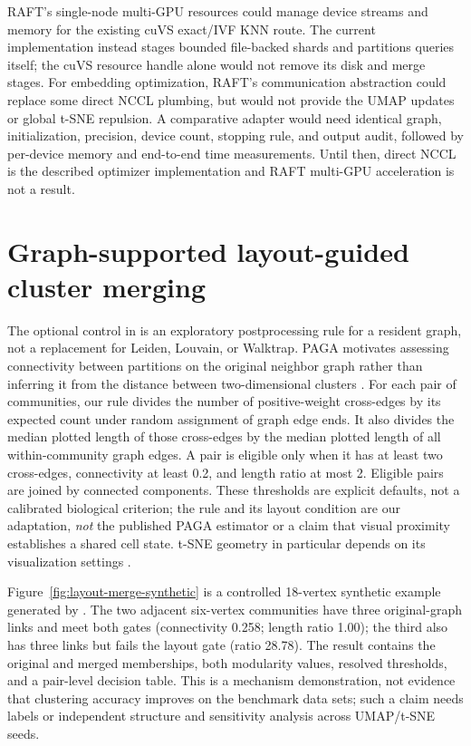 \documentclass[article]{jss}
\begin{document}
RAFT's single-node multi-GPU resources could manage device streams and
memory for the existing cuVS exact/IVF KNN route. The current implementation
instead stages bounded file-backed shards and partitions queries itself;
the cuVS resource handle alone would not remove its disk and merge stages.
For embedding optimization, RAFT's communication abstraction could replace
some direct NCCL plumbing, but would not provide the UMAP updates or global
t-SNE repulsion. A comparative adapter would need identical graph,
initialization, precision, device count, stopping rule, and output audit,
followed by per-device memory and end-to-end time measurements. Until then,
direct NCCL is the described optimizer implementation and RAFT multi-GPU
acceleration is not a result.

\section{Graph-supported layout-guided cluster merging}

The optional  control in  is an
exploratory postprocessing rule for a resident graph, not a replacement for
Leiden, Louvain, or Walktrap. PAGA motivates assessing connectivity between
partitions on the original neighbor graph rather than inferring it from the
distance between two-dimensional clusters \citep{wolf2019paga}. For each
pair of communities, our rule divides the number of positive-weight
cross-edges by its expected count under random assignment of graph edge
ends. It also divides the median plotted length of those cross-edges by
the median plotted length of all within-community graph edges. A pair is
eligible only when it has at least two cross-edges, connectivity at least
0.2, and length ratio at most 2. Eligible pairs are joined by connected
components. These thresholds are explicit defaults, not a calibrated
biological criterion; the rule and its layout condition are our adaptation,
\emph{not} the published PAGA estimator or a claim that visual proximity
establishes a shared cell state. t-SNE geometry in particular depends on
its visualization settings \citep{kobak2019}.

Figure~\ref{fig:layout-merge-synthetic} is a controlled 18-vertex synthetic
example generated by . The two
adjacent six-vertex communities have three original-graph links and meet
both gates (connectivity 0.258; length ratio 1.00); the third also has
three links but fails the layout gate (ratio 28.78). The result contains
the original and merged memberships, both modularity values, resolved
thresholds, and a pair-level decision table. This is a mechanism
demonstration, not evidence that clustering accuracy improves on the
benchmark data sets; such a claim needs labels or independent structure
and sensitivity analysis across UMAP/t-SNE seeds.
\end{document}
